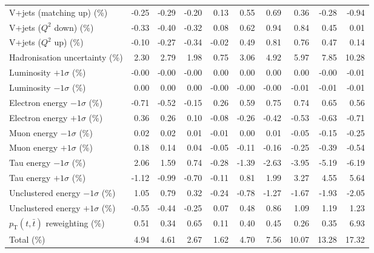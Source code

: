 \begin{table}[htbp]
{\begin{tabular}{lrrrrrrrrr}
V+jets (matching up) (\%) & -0.25 & -0.29 & -0.20 & 0.13 & 0.55 & 0.69 & 0.36 & -0.28 & -0.94 \\ 
V+jets ($Q^{2}$ down) (\%) & -0.33 & -0.40 & -0.32 & 0.08 & 0.62 & 0.94 & 0.84 & 0.45 & 0.01 \\ 
V+jets ($Q^{2}$ up) (\%) & -0.10 & -0.27 & -0.34 & -0.02 & 0.49 & 0.81 & 0.76 & 0.47 & 0.14 \\ 
Hadronisation uncertainty (\%) & 2.30 & 2.79 & 1.98 & 0.75 & 3.06 & 4.92 & 5.97 & 7.85 & 10.28 \\ 
Luminosity $+1\sigma$ (\%) & -0.00 & -0.00 & -0.00 & 0.00 & 0.00 & 0.00 & 0.00 & -0.00 & -0.01 \\ 
Luminosity $-1\sigma$ (\%) & 0.00 & 0.00 & 0.00 & -0.00 & -0.00 & -0.00 & -0.01 & -0.01 & -0.01 \\ 
Electron energy $-1\sigma$ (\%) & -0.71 & -0.52 & -0.15 & 0.26 & 0.59 & 0.75 & 0.74 & 0.65 & 0.56 \\ 
Electron energy $+1\sigma$ (\%) & 0.36 & 0.26 & 0.10 & -0.08 & -0.26 & -0.42 & -0.53 & -0.63 & -0.71 \\ 
Muon energy $-1\sigma$ (\%) & 0.02 & 0.02 & 0.01 & -0.01 & 0.00 & 0.01 & -0.05 & -0.15 & -0.25 \\ 
Muon energy $+1\sigma$ (\%) & 0.18 & 0.14 & 0.04 & -0.05 & -0.11 & -0.16 & -0.25 & -0.39 & -0.54 \\ 
Tau energy $-1\sigma$ (\%) & 2.06 & 1.59 & 0.74 & -0.28 & -1.39 & -2.63 & -3.95 & -5.19 & -6.19 \\ 
Tau energy $+1\sigma$ (\%) & -1.12 & -0.99 & -0.70 & -0.11 & 0.81 & 1.99 & 3.27 & 4.55 & 5.64 \\ 
Unclustered energy $-1\sigma$ (\%) & 1.05 & 0.79 & 0.32 & -0.24 & -0.78 & -1.27 & -1.67 & -1.93 & -2.05 \\ 
Unclustered energy $+1\sigma$ (\%) & -0.55 & -0.44 & -0.25 & 0.07 & 0.48 & 0.86 & 1.09 & 1.19 & 1.23 \\ 
$p_\mathrm{T}(t,\bar{t})$ reweighting (\%) & 0.51 & 0.34 & 0.65 & 0.11 & 0.40 & 0.45 & 0.26 & 0.35 & 6.93 \\ 
\hline 
Total (\%) & 4.94  & 4.61  & 2.67  & 1.62  & 4.70  & 7.56  & 10.07  & 13.28  & 17.32 \\ 
\hline 
\end{tabular}
}
\end{table}
